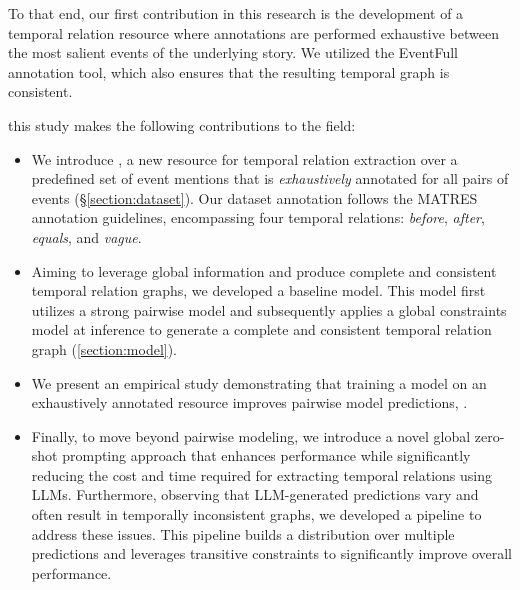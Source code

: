 To that end, our first contribution in this research is the development of a temporal relation resource where annotations are performed exhaustive between the most salient events of the underlying story. We utilized the EventFull \cite{eirew2024eventfullcompleteconsistentevent} annotation tool, which also ensures that the resulting temporal graph is consistent.



this study makes the following contributions to the field: 
\begin{itemize}
    \item We introduce \App{}, a new resource for temporal relation extraction over a predefined set of event mentions that is \textit{exhaustively} annotated for all pairs of events (§\ref{section:dataset}). Our dataset annotation follows the MATRES \cite{ning-etal-2018-multi} annotation guidelines, encompassing four temporal relations: \textit{before}, \textit{after}, \textit{equals}, and \textit{vague}.
    \item Aiming to leverage global information and produce complete and consistent temporal relation graphs, we developed a baseline model. This model first utilizes a strong pairwise model \cite{tan-etal-2023-event} and subsequently applies a global constraints model \cite{ning-etal-2018-joint} at inference to generate a complete and consistent temporal relation graph (\ref{section:model}).
    \item We present an empirical study demonstrating that training a model on an exhaustively annotated resource improves pairwise model predictions, .
    \item Finally, to move beyond pairwise modeling, we introduce a novel global zero-shot prompting approach that enhances performance while significantly reducing the cost and time required for extracting temporal relations using LLMs. Furthermore, observing that LLM-generated predictions vary and often result in temporally inconsistent graphs, we developed a pipeline to address these issues. This pipeline builds a distribution over multiple predictions and leverages transitive constraints to significantly improve overall performance.
\end{itemize}




